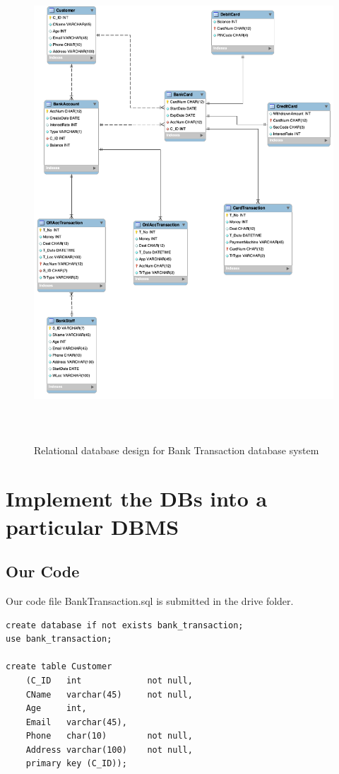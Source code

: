 \documentclass[12pt,a4paper]{article}
\begin{document}
\begin{figure}[H]
      \centering
      \includegraphics[width=5.5in,height=7in]{Picture/Relational_BankTransaction.png}
      \caption{Relational database design for Bank Transaction database system}
\end{figure}




\section{Implement the DBs into a particular DBMS}
\subsection{Our Code}
\indent Our code file BankTransaction.sql is submitted in the drive folder.

\begin{verbatim}
create database if not exists bank_transaction;
use bank_transaction;
 
create table Customer 
    (C_ID   int             not null,
    CName   varchar(45)     not null,
    Age     int,
    Email   varchar(45),
    Phone   char(10)        not null,
    Address varchar(100)    not null,
	primary key (C_ID));

\end{verbatim}
\end{document}
